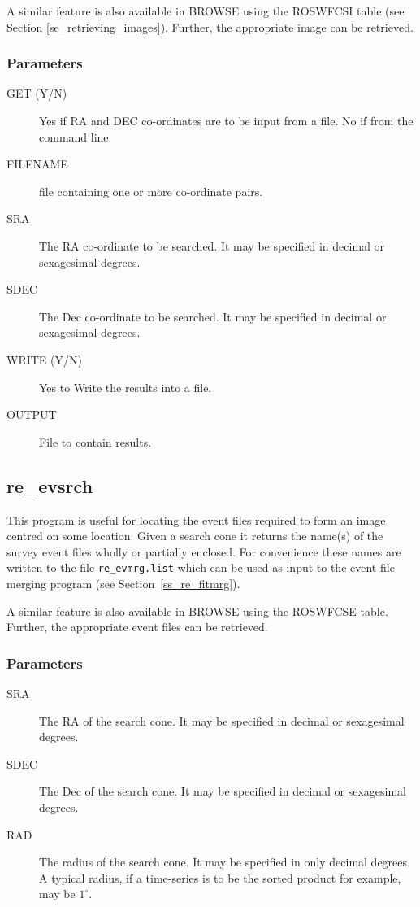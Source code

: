 A similar feature is also available in BROWSE using the ROSWFCSI table
(see Section \ref{se_retrieving_images}).  Further, the appropriate
image can be retrieved.

\subsubsection{Parameters}

\begin{description}
\item[GET (Y/N)  ]
Yes if RA and DEC co-ordinates are to be input from a file.
No if from the command line.
\item[FILENAME  ] file containing one or more co-ordinate pairs.
\item[SRA  ] 
The RA co-ordinate to be searched.  It may be specified in
decimal or sexagesimal degrees.
\item[SDEC  ] 
The Dec co-ordinate to be searched.  It may be specified in
decimal or sexagesimal degrees.
\item[WRITE (Y/N)  ]
Yes to Write the results into a file.
\item[OUTPUT  ]
File to contain results.
\end{description}

\subsection{\label{ss_re_evsrch}re\_evsrch}

This program is useful for locating the event files required to form an
image centred on some location.  Given a search cone it returns the
name(s) of the survey event files wholly or partially enclosed.  For
convenience these names are written to the file {\tt re\_evmrg.list}
which can be used as input to the event file merging program
 (see Section~\ref{ss_re_fitmrg}).

A similar feature is also available in BROWSE using the ROSWFCSE table.  
Further, the appropriate event files can be retrieved.

\subsubsection{Parameters}

\begin{description}

\item[SRA  ] 
The RA of the search cone.  It may be specified in
decimal or sexagesimal degrees.
\item[SDEC  ] 
The Dec of the search cone.  It may be specified in
decimal or sexagesimal degrees.
\item[RAD  ] 
The radius of the search cone.  It may be specified in only decimal
degrees. A typical radius, if a time-series is to be the sorted product
for example, may be $1^{\circ}$.
\end{description}

